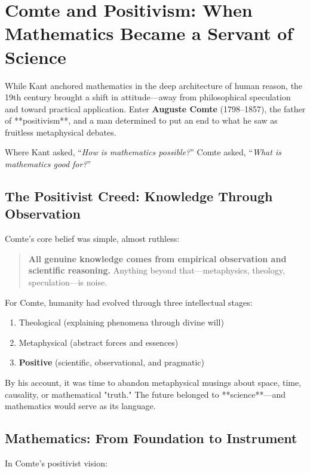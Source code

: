 \section{Comte and Positivism: When Mathematics Became a Servant of Science}

While Kant anchored mathematics in the deep architecture of human reason, the 19th century brought a shift in attitude—away from philosophical speculation and toward practical application. Enter \textbf{Auguste Comte} (1798–1857), the father of **positivism**, and a man determined to put an end to what he saw as fruitless metaphysical debates.

Where Kant asked, “\textit{How is mathematics possible?}”  
Comte asked, “\textit{What is mathematics good for?}”

\subsection*{The Positivist Creed: Knowledge Through Observation}

Comte’s core belief was simple, almost ruthless:

\begin{quote}
\textbf{All genuine knowledge comes from empirical observation and scientific reasoning.}  
Anything beyond that—metaphysics, theology, speculation—is noise.
\end{quote}

For Comte, humanity had evolved through three intellectual stages:

\begin{enumerate}
    \item Theological (explaining phenomena through divine will)
    \item Metaphysical (abstract forces and essences)
    \item \textbf{Positive} (scientific, observational, and pragmatic)
\end{enumerate}

By his account, it was time to abandon metaphysical musings about space, time, causality, or mathematical "truth." The future belonged to **science**—and mathematics would serve as its language.

\subsection*{Mathematics: From Foundation to Instrument}

In Comte’s positivist vision:

